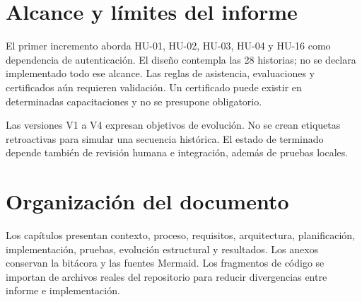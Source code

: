 \section{Alcance y límites del informe}
El primer incremento aborda HU-01, HU-02, HU-03, HU-04 y HU-16 como dependencia de autenticación. El diseño contempla las 28 historias; no se declara implementado todo ese alcance. Las reglas de asistencia, evaluaciones y certificados aún requieren validación. Un certificado puede existir en determinadas capacitaciones y no se presupone obligatorio.

Las versiones V1 a V4 expresan objetivos de evolución. No se crean etiquetas retroactivas para simular una secuencia histórica. El estado de terminado depende también de revisión humana e integración, además de pruebas locales.

\section{Organización del documento}
Los capítulos presentan contexto, proceso, requisitos, arquitectura, planificación, implementación, pruebas, evolución estructural y resultados. Los anexos conservan la bitácora y las fuentes Mermaid. Los fragmentos de código se importan de archivos reales del repositorio para reducir divergencias entre informe e implementación.
